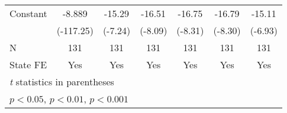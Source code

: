 {\begin{tabular}{l*{6}{c}}
\addlinespace
Constant            &      -8.889\sym{***}&      -15.29\sym{***}&      -16.51\sym{***}&      -16.75\sym{***}&      -16.79\sym{***}&      -15.11\sym{***}\\
                    &   (-117.25)         &     (-7.24)         &     (-8.09)         &     (-8.31)         &     (-8.30)         &     (-6.93)         \\
\midrule
N                   &         131         &         131         &         131         &         131         &         131         &         131         \\
State FE            &         Yes         &         Yes         &         Yes         &         Yes         &         Yes         &         Yes         \\
\bottomrule
\multicolumn{7}{l}{\footnotesize \textit{t} statistics in parentheses}\\
\multicolumn{7}{l}{\footnotesize \sym{*} \(p<0.05\), \sym{**} \(p<0.01\), \sym{***} \(p<0.001\)}\\
\end{tabular}
}
